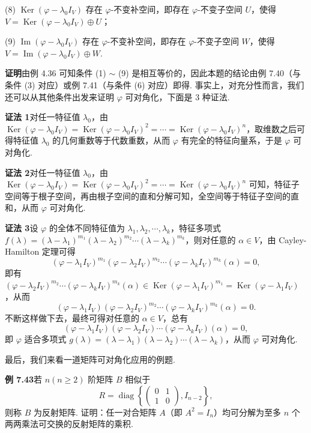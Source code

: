 \documentclass[UTF8, 12pt, fontset=fandol, oneside]{ctexart}
\begin{document}
(8) $\operatorname{Ker}(\varphi-\lambda_0I_V)$ 存在 $\varphi$-不变补空间，即存在 $\varphi$-不变子空间 $U$，使得 $V=\operatorname{Ker}(\varphi-\lambda_0I_V)\oplus U$；

(9) $\operatorname{Im}(\varphi-\lambda_0I_V)$ 存在 $\varphi$-不变补空间，即存在 $\varphi$-不变子空间 $W$，使得 $V=\operatorname{Im}(\varphi-\lambda_0I_V)\oplus W$.

\noindent\textbf{证明}\quad 由例 4.36 可知条件 (1) $\sim$ (9) 是相互等价的，因此本题的结论由例 7.40（与条件 (3) 对应）或例 7.41（与条件 (6) 对应）即得. 事实上，对充分性而言，我们还可以从其他条件出发来证明 $\varphi$ 可对角化，下面是 3 种证法.

\noindent\textbf{证法 1}\quad 对任一特征值 $\lambda_0$，由 $\operatorname{Ker}(\varphi-\lambda_0I_V)=\operatorname{Ker}(\varphi-\lambda_0I_V)^2=\cdots=\operatorname{Ker}(\varphi-\lambda_0I_V)^n$，取维数之后可得特征值 $\lambda_0$ 的几何重数等于代数重数，从而 $\varphi$ 有完全的特征向量系，于是 $\varphi$ 可对角化.

\noindent\textbf{证法 2}\quad 对任一特征值 $\lambda_0$，由 $\operatorname{Ker}(\varphi-\lambda_0I_V)=\operatorname{Ker}(\varphi-\lambda_0I_V)^2=\cdots=\operatorname{Ker}(\varphi-\lambda_0I_V)^n$ 可知，特征子空间等于根子空间，再由根子空间的直和分解可知，全空间等于特征子空间的直和，从而 $\varphi$ 可对角化.

\noindent\textbf{证法 3}\quad 设 $\varphi$ 的全体不同特征值为 $\lambda_1,\lambda_2,\cdots,\lambda_k$，特征多项式 $f(\lambda)=(\lambda-\lambda_1)^{m_1}(\lambda-\lambda_2)^{m_2}\cdots(\lambda-\lambda_k)^{m_k}$，则对任意的 $\alpha\in V$，由 Cayley-Hamilton 定理可得
\[
(\varphi-\lambda_1I_V)^{m_1}(\varphi-\lambda_2I_V)^{m_2}\cdots(\varphi-\lambda_kI_V)^{m_k}(\alpha)=0,
\]
即有 $(\varphi-\lambda_2I_V)^{m_2}\cdots(\varphi-\lambda_kI_V)^{m_k}(\alpha)\in\operatorname{Ker}(\varphi-\lambda_1I_V)^{m_1}=\operatorname{Ker}(\varphi-\lambda_1I_V)$，从而
\[
(\varphi-\lambda_1I_V)(\varphi-\lambda_2I_V)^{m_2}\cdots(\varphi-\lambda_kI_V)^{m_k}(\alpha)=0.
\]
不断这样做下去，最终可得对任意的 $\alpha\in V$，总有
\[
(\varphi-\lambda_1I_V)(\varphi-\lambda_2I_V)\cdots(\varphi-\lambda_kI_V)(\alpha)=0,
\]
即 $\varphi$ 适合多项式 $g(\lambda)=(\lambda-\lambda_1)(\lambda-\lambda_2)\cdots(\lambda-\lambda_k)$，从而 $\varphi$ 可对角化.

最后，我们来看一道矩阵可对角化应用的例题.

\noindent\textbf{例 7.43}\quad 若 $n(n\ge 2)$ 阶矩阵 $B$ 相似于
\[
R=\operatorname{diag}\left\{
\left(\begin{array}{cc}
0 & 1\\
1 & 0
\end{array}\right),I_{n-2}\right\},
\]
则称 $B$ 为反射矩阵. 证明：任一对合矩阵 $A$（即 $A^2=I_n$）均可分解为至多 $n$ 个两两乘法可交换的反射矩阵的乘积.
\end{document}
